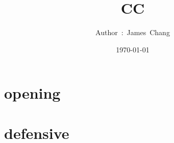

\title{CC}
\author{ {\Biohazard} \hspace{1.5mm} \hspace{1.5mm} Author\ :\ James\ Chang}
\date{\today}


\large

\tableofcontents

\chapter{opening}



\chapter{defensive}




